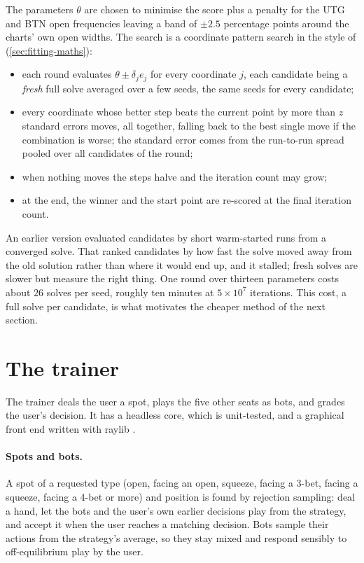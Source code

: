 The parameters $\theta$ are chosen to minimise the score plus a penalty for the UTG and BTN open frequencies leaving a band of $\pm 2.5$ percentage points around the charts' own open widths. The search is a coordinate pattern search in the style of \textcite{hooke1961} (\cref{sec:fitting-maths}):
\begin{itemize}
  \item each round evaluates $\theta \pm \delta_j e_j$ for every coordinate $j$, each candidate being a \emph{fresh} full solve averaged over a few seeds, the same seeds for every candidate;
  \item every coordinate whose better step beats the current point by more than $z$ standard errors moves, all together, falling back to the best single move if the combination is worse; the standard error comes from the run-to-run spread pooled over all candidates of the round;
  \item when nothing moves the steps halve and the iteration count may grow;
  \item at the end, the winner and the start point are re-scored at the final iteration count.
\end{itemize}
An earlier version evaluated candidates by short warm-started runs from a converged solve. That ranked candidates by how fast the solve moved away from the old solution rather than where it would end up, and it stalled; fresh solves are slower but measure the right thing. One round over thirteen parameters costs about $26$ solves per seed, roughly ten minutes at $5\times 10^7$ iterations. This cost, a full solve per candidate, is what motivates the cheaper method of the next section.


\section{The trainer}\label{sec:trainer}

The trainer deals the user a spot, plays the five other seats as bots, and grades the user's decision. It has a headless core, which is unit-tested, and a graphical front end written with raylib \cite{raylib}.

\paragraph{Spots and bots.} A spot of a requested type (open, facing an open, squeeze, facing a 3-bet, facing a squeeze, facing a 4-bet or more) and position is found by rejection sampling: deal a hand, let the bots and the user's own earlier decisions play from the strategy, and accept it when the user reaches a matching decision. Bots sample their actions from the strategy's average, so they stay mixed and respond sensibly to off-equilibrium play by the user.

